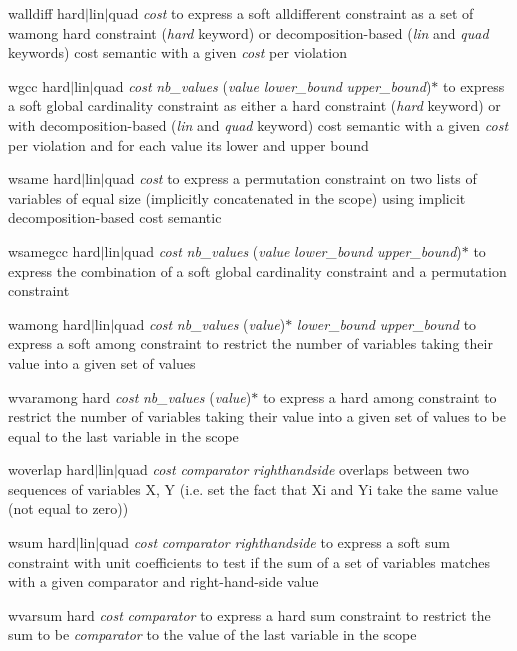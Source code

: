 \documentclass{article}
\begin{document}
\begin{DoxyItemize}
\begin{DoxyItemize}
\item walldiff hard$\vert$lin$\vert$quad {\itshape cost} to express a soft alldifferent constraint as a set of wamong hard constraint ({\itshape hard} keyword) or decomposition-\/based ({\itshape lin} and {\itshape quad} keywords) cost semantic with a given {\itshape cost} per violation
\item wgcc hard$\vert$lin$\vert$quad {\itshape cost} {\itshape nb\-\_\-values} ({\itshape value} {\itshape lower\-\_\-bound} {\itshape upper\-\_\-bound})$\ast$ to express a soft global cardinality constraint as either a hard constraint ({\itshape hard} keyword) or with decomposition-\/based ({\itshape lin} and {\itshape quad} keyword) cost semantic with a given {\itshape cost} per violation and for each value its lower and upper bound
\item wsame hard$\vert$lin$\vert$quad {\itshape cost} to express a permutation constraint on two lists of variables of equal size (implicitly concatenated in the scope) using implicit decomposition-\/based cost semantic
\item wsamegcc hard$\vert$lin$\vert$quad {\itshape cost} {\itshape nb\-\_\-values} ({\itshape value} {\itshape lower\-\_\-bound} {\itshape upper\-\_\-bound})$\ast$ to express the combination of a soft global cardinality constraint and a permutation constraint
\item wamong hard$\vert$lin$\vert$quad {\itshape cost} {\itshape nb\-\_\-values} ({\itshape value})$\ast$ {\itshape lower\-\_\-bound} {\itshape upper\-\_\-bound} to express a soft among constraint to restrict the number of variables taking their value into a given set of values
\item wvaramong hard {\itshape cost} {\itshape nb\-\_\-values} ({\itshape value})$\ast$ to express a hard among constraint to restrict the number of variables taking their value into a given set of values to be equal to the last variable in the scope
\item woverlap hard$\vert$lin$\vert$quad {\itshape cost} {\itshape comparator} {\itshape righthandside} overlaps between two sequences of variables X, Y (i.\-e. set the fact that Xi and Yi take the same value (not equal to zero))
\item wsum hard$\vert$lin$\vert$quad {\itshape cost} {\itshape comparator} {\itshape righthandside} to express a soft sum constraint with unit coefficients to test if the sum of a set of variables matches with a given comparator and right-\/hand-\/side value
\item wvarsum hard {\itshape cost} {\itshape comparator} to express a hard sum constraint to restrict the sum to be {\itshape comparator} to the value of the last variable in the scope


\end{DoxyItemize}
\end{DoxyItemize}
\end{document}
